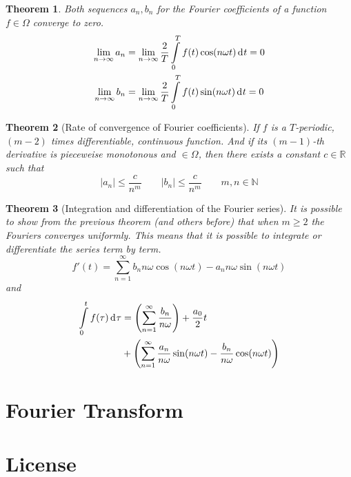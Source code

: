 \documentclass[twocolumn, margin=small]{tex/hsrzf}
\newcommand\Nset{\mathbb{N}}
\newcommand\Rset{\mathbb{R}}
\newcommand\len[1]{\lvert#1\rvert}
\theoremstyle{komfourzf}
\newtheorem{theorem}{Theorem}
\begin{document}
\begin{theorem} Both sequences \(a_n, b_n\) for the Fourier coefficients of a function \(f\in\Omega\) converge to zero.
  \begin{align*}
    \lim_{n\to\infty} a_n 
      &= \lim_{n\to\infty} \frac{2}{T}
          \int\limits_0^T f(t) \cos(n\omega t) \,\mathrm{d}^{} t = 0 \\
    \lim_{n\to\infty} b_n 
      &= \lim_{n\to\infty} \frac{2}{T}
          \int\limits_0^T f(t) \sin(n\omega t) \,\mathrm{d}^{} t = 0
  \end{align*}
\end{theorem}

\begin{theorem}[Rate of convergence of Fourier coefficients]
  If \(f\) is a \(T\)-periodic, \((m-2)\) times differentiable, continuous function. And if its \((m-1)\)-th derivative is pieceweise monotonous and \(\in \Omega\), then there exists a constant \(c \in\Rset\) such that
  \[
    \len{a_n} \leq \frac{c}{n^m} \qquad \len{b_n} \leq \frac{c}{n^m} \qquad m,n\in\Nset
  \]
\end{theorem}

\begin{theorem}[Integration and differentiation of the Fourier series]
  It is possible to show from the previous theorem (and others before) that when \(m\geq 2\) the Fouriers converges \emph{uniformly}. This means that it is possible to integrate or differentiate the series term by term.
  \[
    f'(t) = \sum_{n=1}^\infty b_n n\omega\cos(n\omega t) - a_n n\omega\sin(n\omega t)
  \]
  and
  \begin{align*}
    \int\limits_0^t f(\tau) \,\mathrm{d}^{} \tau &=
      \left(\sum_{n=1}^\infty \frac{b_n}{n\omega} \right)
      + \frac{a_0}{2} t \\
      &+ \left(\sum_{n=1}^\infty
          \frac{a_n}{n\omega}\sin(n\omega t)
          - \frac{b_n}{n\omega}\cos(n\omega t)
        \right)
  \end{align*}
\end{theorem}

\section{Fourier Transform}

\section{License}
\doclicenseThis
\end{document}
